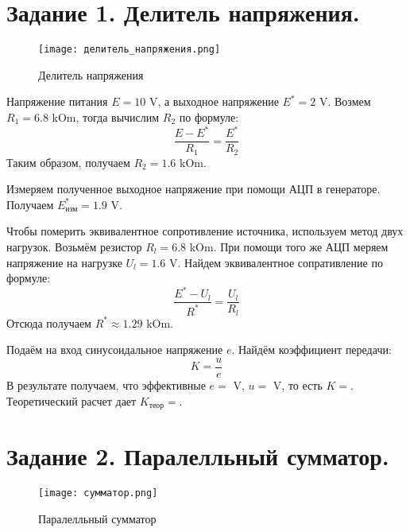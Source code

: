 



    

    \section*{Задание 1. Делитель напряжения.}

    \begin{figure}[h!]
        \centering
        \texttt{[image: делитель\_напряжения.png]}
        \caption{Делитель напряжения}
    \end{figure}

    \noindent Напряжение питания $E = 10$ V, а выходное напряжение $E^* = 2$ V. 
    Возмем $R_1 = 6.8$ kOm, тогда вычислим $R_2$ по формуле:
    \begin{equation*}
        \frac{E - E^*}{R_1} = \frac{E^*}{R_2}
    \end{equation*} 
    Таким образом, получаем $R_2 = 1.6$ kOm.

    \noindent Измеряем полученное выходное напряжение при помощи АЦП в
    генераторе. Получаем $E^*_{\text{изм}} = 1.9$ V.

    \noindent Чтобы померить эквивалентное сопротивление источника, используем метод двух нагрузок. 
    Возьмём резистор $R_l = 6.8$ kOm. 
    При помощи того же АЦП меряем напряжение на нагрузке $U_l = 1.6$ V.
    Найдем эквивалентное сопративление по формуле:
    \begin{equation*}
        \frac{E^* - U_l}{R^*} = \frac{U_l}{R_l}
    \end{equation*} 
    Отсюда получаем $R^* \approx 1.29 $ kOm.

    \noindent Подаём на вход синусоидальное напряжение $e$. 
    Найдём коэффициент передачи:
    \begin{equation*}
        K = \frac{u}{e}
    \end{equation*} 
    В результате получаем, что эффективные $e = $ V, $u = $ V, то есть $K = $.
    Теоретический расчет дает $K_{\text{теор}} = $.

    \section*{Задание 2. Паралелльный сумматор.}

    \begin{figure}[h!]
        \centering
        \texttt{[image: сумматор.png]}
        \caption{Паралелльный сумматор}
    \end{figure}

